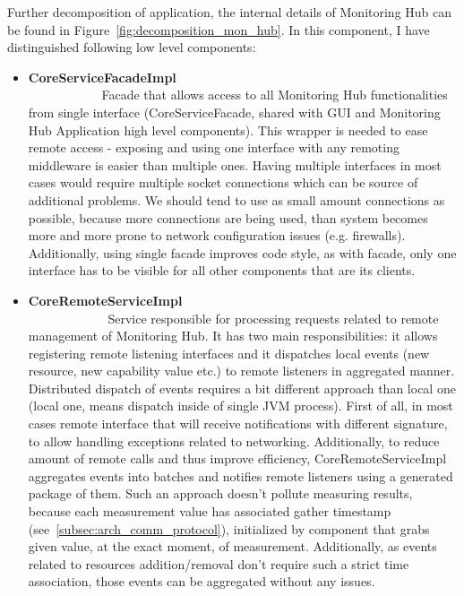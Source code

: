 Further decomposition of application, the internal details of Monitoring Hub can be found in Figure~\ref{fig:decomposition_mon_hub}. In this component, I have distinguished following low level components:

\begin{itemize}

\item {\bf CoreServiceFacadeImpl}~~~~~~~~~~~~~~~~~~~~~~~~~~~~~~~~~~~~~~~~~~~~~~~~~~~~~~~~\linebreak
Facade that allows access to all Monitoring Hub functionalities from single interface (CoreServiceFacade, shared with GUI and Monitoring Hub Application high level components). This wrapper is needed to ease remote access - exposing and using one interface with any remoting middleware is easier than multiple ones. Having multiple interfaces in most cases would require multiple socket connections which can be source of additional problems. We should tend to use as small amount connections as possible, because more connections are being used, than system becomes more and more prone to network configuration issues (e.g. firewalls). Additionally, using single facade improves code style, as with facade, only one interface has to be visible for all other components that are its clients.

\item {\bf CoreRemoteServiceImpl}~~~~~~~~~~~~~~~~~~~~~~~~~~~~~~~~~~~~~~~~~~~~~~~~~~~~~~~~\linebreak
Service responsible for processing requests related to remote management of Monitoring Hub. It has two main responsibilities: it allows registering remote listening interfaces and it dispatches local events (new resource, new capability value etc.) to remote listeners in aggregated manner. Distributed dispatch of events requires a bit different approach than local one (local one, means dispatch inside of single JVM process). First of all, in most cases remote interface that will receive notifications with different signature, to allow handling exceptions related to networking. Additionally, to reduce amount of remote calls and thus improve efficiency, CoreRemoteServiceImpl aggregates events into batches and notifies remote listeners using a generated package of them. Such an approach doesn't pollute measuring results, because each measurement value has associated gather timestamp (see~\ref{subsec:arch_comm_protocol}), initialized by component that grabs given value, at the exact moment, of measurement. Additionally, as events related to resources addition/removal don\rq{}t require such a strict time association, those events can be aggregated without any issues.


\end{itemize}
